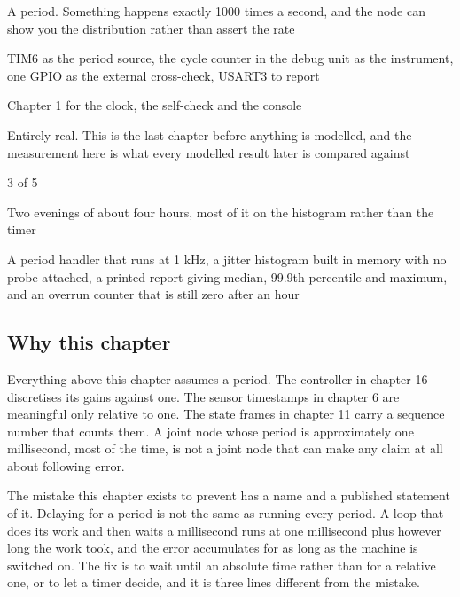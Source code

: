 
\begin{keyfacts}
\item[Adds to the node] A period. Something happens exactly 1000 times a second, and the node can show you the distribution rather than assert the rate
\item[Peripherals] TIM6 as the period source, the cycle counter in the debug unit as the instrument, one GPIO as the external cross-check, USART3 to report
\item[Depends on] Chapter 1 for the clock, the self-check and the console
\item[Real or modelled] Entirely real. This is the last chapter before anything is modelled, and the measurement here is what every modelled result later is compared against
\item[Difficulty] 3 of 5
\item[Effort] Two evenings of about four hours, most of it on the histogram rather than the timer
\item[Deliverable] A period handler that runs at 1 kHz, a jitter histogram built in memory with no probe attached, a printed report giving median, 99.9th percentile and maximum, and an overrun counter that is still zero after an hour
\end{keyfacts}

\subsection*{Why this chapter}

Everything above this chapter assumes a period. The controller in chapter 16
discretises its gains against one. The sensor timestamps in chapter 6 are
meaningful only relative to one. The state frames in chapter 11 carry a sequence
number that counts them. A joint node whose period is approximately one
millisecond, most of the time, is not a joint node that can make any claim at
all about following error.

The mistake this chapter exists to prevent has a name and a published statement
of it. Delaying for a period is not the same as running every period. A loop
that does its work and then waits a millisecond runs at one millisecond plus
however long the work took, and the error accumulates for as long as the machine
is switched on. The fix is to wait until an absolute time rather than for a
relative one, or to let a timer decide, and it is three lines different from the
mistake.

